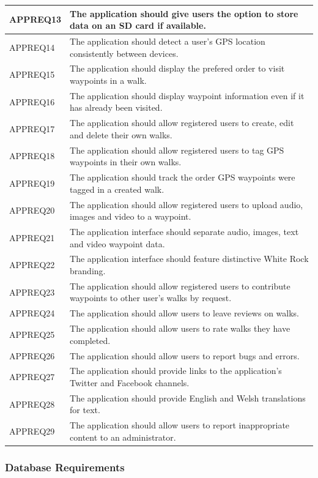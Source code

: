 \documentclass[11pt,a4paper]{article}
\begin{document}
\begin{longtable}{|p{2.5cm}p{13cm}|}
APPREQ13 & The application should give users the option to store data on an SD card if available. \\ \hline
APPREQ14 & The application should detect a user's GPS location consistently between devices. \\ \hline
APPREQ15 & The application should display the prefered order to visit waypoints in a walk. \\ \hline
APPREQ16 & The application should display waypoint information even if it has already been visited. \\ \hline
APPREQ17 & The application should allow registered users to create, edit and delete their own walks. \\ \hline
APPREQ18 & The application should allow registered users to tag GPS waypoints in their own walks. \\ \hline
APPREQ19 & The application should track the order GPS waypoints were tagged in a created walk. \\ \hline
APPREQ20 & The application should allow registered users to upload audio, images and video to a waypoint. \\ \hline
APPREQ21 & The application interface should separate audio, images, text and video waypoint data. \\ \hline
APPREQ22 & The application interface should feature distinctive White Rock branding. \\ \hline
APPREQ23 & The application should allow registered users to contribute waypoints to other user's walks by request. \\ \hline
APPREQ24 & The application should allow users to leave reviews on walks. \\ \hline
APPREQ25 & The application should allow users to rate walks they have completed. \\ \hline
APPREQ26 & The application should allow users to report bugs and errors. \\ \hline
APPREQ27 & The application should provide links to the application's Twitter and Facebook channels. \\ \hline
APPREQ28 & The application should provide English and Welsh translations for text. \\ \hline
APPREQ29 & The application should allow users to report inappropriate content to an administrator. \\ \hline

\end{longtable}

\subsubsection{Database Requirements}
\label{sec:db-reqs}
\end{document}
